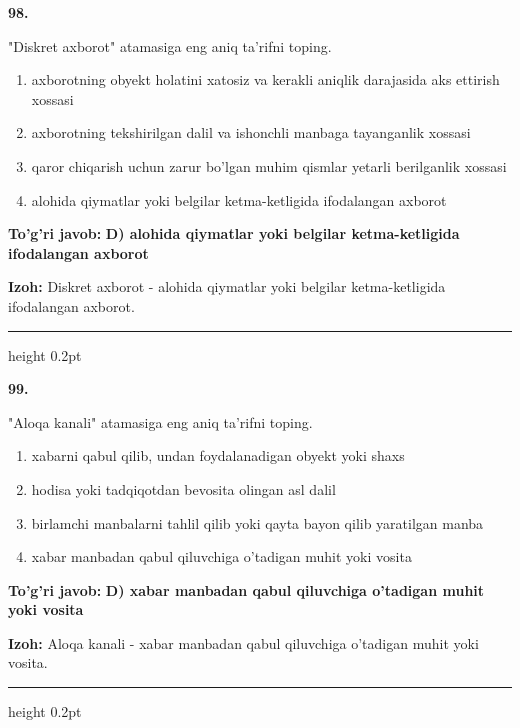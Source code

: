 \documentclass[10pt,a4paper,oneside]{article}
\begin{document}
\noindent\textbf{\color{ink}98.}
\par
"Diskret axborot" atamasiga eng aniq ta'rifni toping.
\begin{enumerate}[label=\Alph*),leftmargin=9mm]
\item axborotning obyekt holatini xatosiz va kerakli aniqlik darajasida aks ettirish xossasi
\item axborotning tekshirilgan dalil va ishonchli manbaga tayanganlik xossasi
\item qaror chiqarish uchun zarur bo'lgan muhim qismlar yetarli berilganlik xossasi
\item alohida qiymatlar yoki belgilar ketma-ketligida ifodalangan axborot
\end{enumerate}
\begin{tcolorbox}[enhanced,breakable,colback=teal!4,colframe=teal!50!black,boxrule=0.5pt,arc=1.1mm,left=3mm,right=3mm,top=1.7mm,bottom=1.7mm,before skip=2mm,after skip=2mm]
\textbf{\color{teal}To'g'ri javob:} \textbf{D) alohida qiymatlar yoki belgilar ketma-ketligida ifodalangan axborot}
\par\smallskip
\textbf{Izoh:} Diskret axborot - alohida qiymatlar yoki belgilar ketma-ketligida ifodalangan axborot.
\end{tcolorbox}
\vspace{2mm}\hrule height 0.2pt \vspace{3mm}

\noindent\textbf{\color{ink}99.}
\par
"Aloqa kanali" atamasiga eng aniq ta'rifni toping.
\begin{enumerate}[label=\Alph*),leftmargin=9mm]
\item xabarni qabul qilib, undan foydalanadigan obyekt yoki shaxs
\item hodisa yoki tadqiqotdan bevosita olingan asl dalil
\item birlamchi manbalarni tahlil qilib yoki qayta bayon qilib yaratilgan manba
\item xabar manbadan qabul qiluvchiga o'tadigan muhit yoki vosita
\end{enumerate}
\begin{tcolorbox}[enhanced,breakable,colback=teal!4,colframe=teal!50!black,boxrule=0.5pt,arc=1.1mm,left=3mm,right=3mm,top=1.7mm,bottom=1.7mm,before skip=2mm,after skip=2mm]
\textbf{\color{teal}To'g'ri javob:} \textbf{D) xabar manbadan qabul qiluvchiga o'tadigan muhit yoki vosita}
\par\smallskip
\textbf{Izoh:} Aloqa kanali - xabar manbadan qabul qiluvchiga o'tadigan muhit yoki vosita.
\end{tcolorbox}
\vspace{2mm}\hrule height 0.2pt \vspace{3mm}
\end{document}
